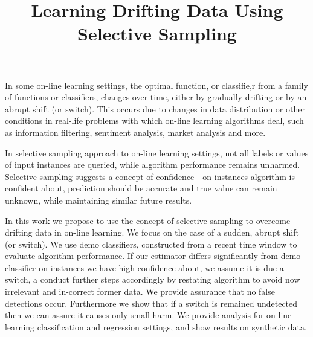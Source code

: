 \documentclass[a4paper,12pt]{article}
\title{Learning Drifting Data Using Selective Sampling}
\begin{document}
\maketitle
In some on-line learning settings, the optimal function, or classifie,r from a family of functions or classifiers, changes over time, either by gradually drifting or by an abrupt shift (or switch). This occurs due to changes in data distribution or other conditions in real-life problems with which on-line learning algorithms deal, such as information filtering, sentiment analysis, market analysis and more.\newline\newline

In selective sampling approach to on-line learning settings, not all labels or values of input instances are queried, while algorithm performance remains unharmed. Selective sampling suggests a concept of confidence - on instances algorithm is confident about, prediction should be accurate and true value can remain unknown, while maintaining similar future results.\newline 

In this work we propose to use the concept of selective sampling to overcome drifting data in on-line learning. We focus on the case of a sudden, abrupt shift (or switch). We use demo classifiers, constructed from a recent time window to evaluate algorithm performance. If our estimator differs significantly from demo classifier on instances we have high confidence about, we assume it is due a switch, a conduct further steps accordingly by restating algorithm to avoid now irrelevant and in-correct former data. We provide assurance that no false detections occur. Furthermore we show that if a switch is remained undetected then we can assure it causes only small harm.
We provide analysis for on-line learning classification and regression settings, and show results on synthetic data. 
 
\end{document}
